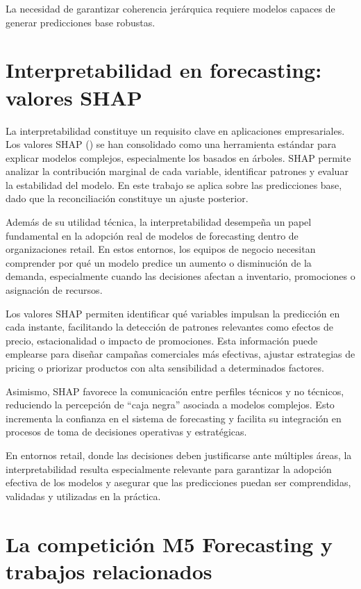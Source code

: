 \documentclass[IB,BIB]{TFUOC}%
\begin{document}
La necesidad de garantizar coherencia jerárquica requiere modelos
capaces de generar predicciones base robustas.

\section{Interpretabilidad en forecasting: valores SHAP}

La interpretabilidad constituye un requisito clave en aplicaciones
empresariales. Los valores SHAP (\cite{lundberg2017shap}) se han
consolidado como una herramienta estándar para explicar modelos
complejos, especialmente los basados en árboles. SHAP permite analizar
la contribución marginal de cada variable, identificar patrones y
evaluar la estabilidad del modelo. En este trabajo se aplica sobre las
predicciones base, dado que la reconciliación constituye un ajuste
posterior.

Además de su utilidad técnica, la interpretabilidad
desempeña un papel fundamental en la adopción real de modelos de
forecasting dentro de organizaciones retail. En estos entornos, los
equipos de negocio necesitan comprender por qué un modelo predice un
aumento o disminución de la demanda, especialmente cuando las decisiones
afectan a inventario, promociones o asignación de recursos.

Los valores SHAP permiten identificar qué variables
impulsan la predicción en cada instante, facilitando la detección de
patrones relevantes como efectos de precio, estacionalidad o impacto de
promociones. Esta información puede emplearse para diseñar campañas
comerciales más efectivas, ajustar estrategias de pricing o priorizar
productos con alta sensibilidad a determinados factores.

Asimismo, SHAP favorece la comunicación entre perfiles
técnicos y no técnicos, reduciendo la percepción de ``caja negra''
asociada a modelos complejos. Esto incrementa la confianza en el sistema
de forecasting y facilita su integración en procesos de toma de
decisiones operativas y estratégicas.

En entornos retail, donde las decisiones deben
justificarse ante múltiples áreas, la interpretabilidad resulta
especialmente relevante para garantizar la adopción efectiva de los
modelos y asegurar que las predicciones puedan ser comprendidas,
validadas y utilizadas en la práctica.

\section{La competición M5 Forecasting y trabajos relacionados}
\end{document}
